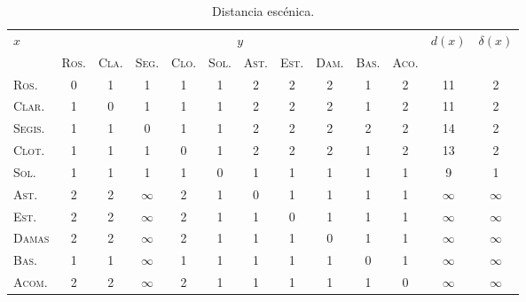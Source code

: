 \begin{table}[h!]
	\centering\footnotesize
	\begin{tabular}{lcccccccccccc}
		\toprule
		$x$&\multicolumn{10}{c}{$y$}&$d(x)$&$\delta(x)$\\
		\cline{2-11}
		&\textsc{Ros.} & \textsc{Cla.}& \textsc{Seg.}& \textsc{Clo.}& \textsc{Sol.}& \textsc{Ast.}& \textsc{Est.}& \textsc{Dam.}& \textsc{Bas.}&  \textsc{Aco.}&& \\
		\midrule
		\textsc{Ros.}& 0 & 1 & 1 & 1 & 1 & 2 & 2 & 2 & 1 & 2 & 11&2\\
		\textsc{Clar.}& 1 & 0& 1 & 1 & 1 & 2 & 2 & 2 & 1 & 2& 11&2\\
		\textsc{Segis.}&1&1&0&1&1&2&2&2&2&2 & 14&2\\
		\textsc{Clot.}&1&1&1&0&1&2&2&2&1&2 & 13&2\\
		\textsc{Sol.}&1&1&1&1&0&1&1&1&1&1& 9&1\\
		\textsc{Ast.}&2&2&$\infty$&2&1&0&1&1&1&1&$\infty$&$\infty$\\
		\textsc{Est.}&2&2&$\infty$&2&1&1&0&1&1&1&$\infty$&$\infty$\\
		\textsc{Damas}&2&2&$\infty$&2&1&1&1&0&1&1&$\infty$&$\infty$\\
		\textsc{Bas.}&1&1&$\infty$&1&1&1&1&1&0&1&$\infty$&$\infty$\\
		\textsc{Acom.}&2&2&$\infty$&2&1&1&1&1&1&0&$\infty$&$\infty$\\
		\bottomrule
	\end{tabular}
	\caption{Distancia escénica.}
	\label{tab:distancia}
\end{table}
